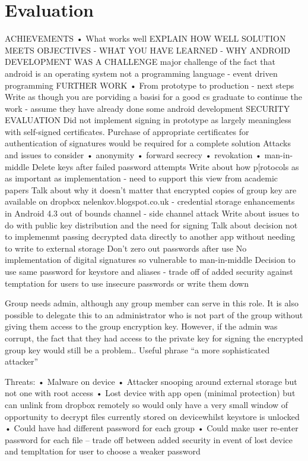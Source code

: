 
\chapter{Evaluation}
\label{cha:eval}

ACHIEVEMENTS
• What works well
EXPLAIN HOW WELL SOLUTION MEETS OBJECTIVES -
WHAT YOU HAVE LEARNED - WHY ANDROID DEVELOPMENT WAS A CHALLENGE
major challenge of the fact that android is an operating system not a programming language - event driven programming
FURTHER WORK
• From prototype to production - next steps
Write as though you are porviding a basisi for a good cs graduate to continue the work - assume they have already done some android development
SECURITY EVALUATION
Did not implement signing in prototype as largely meaningless with self-signed certificates. Purchase of appropriate certificates for authentication of signatures would be required for a complete solution
Attacks and issues to consider
• anonymity
• forward secrecy
• revokation
• man-in-middle
Delete keys after failed password attempts
Write about how p[rotocols as as important as implementation - need to support this view from academic papers
Talk about why it doesn't matter that encrypted copies of group key are available on dropbox
nelenkov.blogspot.co.uk - credential storage enhancements in Android 4.3
out of bounds channel - side channel attack
Write about issues to do with public key distribution and the need for signing
Talk about decision not to implemenmt passing decrypted data directly to another app without needing to write to external storage
Don't zero out passwords after use
No implementation of digital signatures so vulnerable to man-in-middle
Decision to use same password for keystore and aliases - trade off of added security against temptation for users to use insecure passwords or write them down




Group needs admin, although any group member can serve in this role.  It is also possible to delegate this to an administrator who is not part of the group without giving them access to the group encryption key.  However, if the admin was corrupt, the fact that they had access to the private key for signing the encrypted group key would still be a problem.. Useful phrase “a more sophisticated attacker”

Threats:
•	Malware on device
•	Attacker snooping around external storage but not one with root access
•	Lost device with app open (minimal protection) but can unlink from dropbox remotely so would only have a very small window of opportunity to decrypt files currently stored on devicewhilst keystore is unlocked
•	Could have had different password for each group
•	Could make user re-enter password for each file – trade off between added security in event of lost device and templtation for user to choose a weaker password

